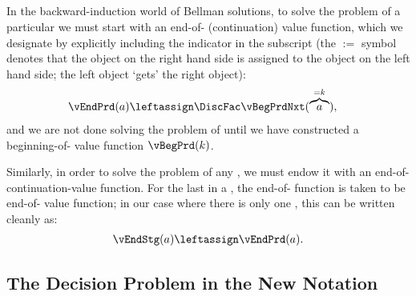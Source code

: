 \documentclass[SolvingMicroDSOPs]{subfiles}
\begin{document}
\ifpseudo{
\nopagebreak
}{}

\hypertarget{transitions}{}
\subsection{\Trnsns}\label{subsec:transitions}

In the backward-induction world of Bellman solutions, to solve the problem of a particular {\interval} we must start with an end-of-{\interval} (continuation) value function, which we designate by explicitly including the {\interval} indicator in the subscript (the $:=$ symbol denotes that the object on the right hand side is assigned to the object on the left hand side; the left object `gets' the right object):\normalsize
  \begin{equation}\begin{gathered}\begin{aligned}
        \vEndPrd(\aNrm) & \leftassign \DiscFac \vBegPrdNxt(\overbrace{\aNrm}^{=\kNrm}), \label{eq:trns-single-prd}  %
  \end{aligned}\end{gathered}\end{equation}
and we are not done solving the problem of {\interval} {\prd} until we have constructed a beginning-of-{\interval} value function $\vBegPrd(\kNrm)$.

Similarly, in order to solve the problem of any {\stg}, we must endow it with an end-of-{\stg} continuation-value function.  For the last {\stg} in a {\interval}, the end-of-{\stg} function is taken to be end-of-{\interval} value function; in our case where there is only one {\stg}, this can be written cleanly as:
  \begin{equation}\begin{gathered}\begin{aligned} \label{eq:last-stg-v-is-end-prd-v} 
        \vEndStg(\aNrm) \leftassign \vEndPrd(\aNrm). 
      \end{aligned}\end{gathered}\end{equation}

\normalsize   
  
\subsection{The Decision Problem in the New Notation}\label{subsec:decision-problem}\hypertarget{decision-problem}{}
\end{document}
